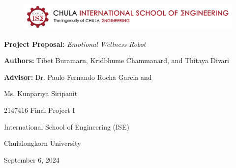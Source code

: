 \documentclass[a4paper,10pt]{article}
\begin{document}
\begin{titlepage}
    \centering  
    \begin{figure}[ht]
        \centering
        \includegraphics[width=\textwidth]{ise-logo.png}
    \end{figure}
    \vspace*{2cm} 
    
    {\Huge \textbf{Project Proposal:} \textit{Emotional Wellness Robot} \par}
    \vspace{4cm}
    
    {\large \textbf{Authors:} Tibet Buramarn, Kridbhume Chammanard, and Thitaya Divari \par}
    \vspace{1cm}
    {\large \textbf{Advisor:} Dr. Paulo Fernando Rocha Garcia and \par}
    {\large Ms. Kunpariya Siripanit \par}

    \vspace{3cm}
    
    {\large 2147416 Final Project I \par}
    {\large International School of Engineering (ISE) \par}
    {\large Chulalongkorn University \par}
    
    \vspace{2cm}
    
    {\large September 6, 2024 \par}
    
    \vspace*{\fill}
\end{titlepage}

\thispagestyle{empty}
\end{document}
